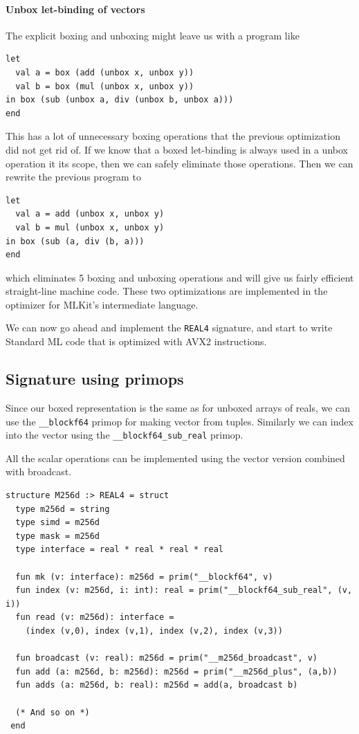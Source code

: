 \documentclass{article}
\begin{document}
\paragraph{Unbox let-binding of vectors}
The explicit boxing and unboxing might leave us with a program like
\begin{verbatim}
let
  val a = box (add (unbox x, unbox y))
  val b = box (mul (unbox x, unbox y))
in box (sub (unbox a, div (unbox b, unbox a)))
end
\end{verbatim}
This has a lot of unnecessary boxing operations that the previous optimization did not get rid of. If we know that a boxed let-binding is always used in a unbox operation it its scope, then we can safely eliminate those operations. Then we can rewrite the previous program to
\begin{verbatim}
let
  val a = add (unbox x, unbox y)
  val b = mul (unbox x, unbox y)
in box (sub (a, div (b, a)))
end
\end{verbatim}
which eliminates 5 boxing and unboxing operations and will give us fairly efficient straight-line machine code. These two optimizations are implemented in the optimizer for MLKit's intermediate language.

We can now go ahead and implement the \verb!REAL4! signature, and start to write Standard ML code that is optimized with AVX2 instructions.

\subsection{Signature using primops}

Since our boxed representation is the same as for unboxed arrays of reals, we can use the \verb!__blockf64! primop for making vector from tuples. Similarly we can index into the vector using the \verb!__blockf64_sub_real! primop.

All the scalar operations can be implemented using the vector version combined with broadcast.
\begin{verbatim}
structure M256d :> REAL4 = struct
  type m256d = string
  type simd = m256d
  type mask = m256d
  type interface = real * real * real * real

  fun mk (v: interface): m256d = prim("__blockf64", v)
  fun index (v: m256d, i: int): real = prim("__blockf64_sub_real", (v, i))
  fun read (v: m256d): interface =
    (index (v,0), index (v,1), index (v,2), index (v,3))

  fun broadcast (v: real): m256d = prim("__m256d_broadcast", v)
  fun add (a: m256d, b: m256d): m256d = prim("__m256d_plus", (a,b))
  fun adds (a: m256d, b: real): m256d = add(a, broadcast b)

  (* And so on *)
 end
\end{verbatim}
\end{document}
